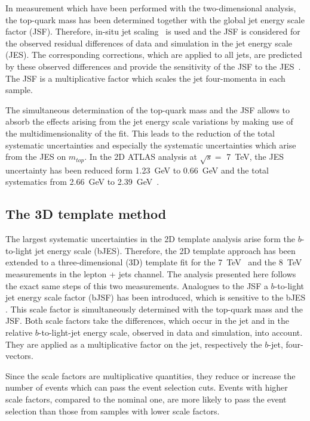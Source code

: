 In measurement which have been performed with the two-dimensional analysis, the top-quark mass has been determined together with the global jet energy scale factor (JSF). Therefore, in-situ jet scaling~\cite{ATLAS:2012aj}  is used and the JSF is considered for the observed residual differences of data and simulation in the jet energy scale (JES). The corresponding corrections, which are applied to all jets, are predicted by these observed differences and provide the sensitivity of the JSF to the JES~\cite{ATLAS:2012aj}. The JSF is a multiplicative factor which scales the jet four-momenta in each sample.  

The simultaneous determination of the top-quark mass and the JSF allows to absorb the effects arising from the jet energy scale variations by making use of the multidimensionality of the fit.
This leads to the  reduction of the total systematic uncertainties and especially the systematic uncertainties which arise from the JES  on $m_{top}$. In the 2D ATLAS analysis at $\sqrt{s} =$ 7~TeV, the JES uncertainty has been reduced form 1.23~GeV to 0.66~GeV and the total systematics from 2.66~GeV to 2.39~GeV~\cite{ATLAS:2012aj}.  


\subsection{ The 3D template method}
The largest systematic uncertainties in the 2D template analysis arise form the $b$-to-light jet energy scale (bJES). Therefore, the 2D template approach has been extended to a three-dimensional (3D) template fit for the 7~TeV~\cite{Aad:2015nba} and the 8~TeV~\cite{ATLAS-CONF-2017-071} measurements in the lepton + jets channel. The analysis presented here follows the exact same steps of this two measurements.  
Analogues  to the JSF a $b$-to-light jet energy scale factor (bJSF) has been introduced, which is sensitive to the bJES . This scale factor is simultaneously determined with the top-quark mass and the JSF.  Both scale factors take the differences, which occur in the jet and in the relative
  $b$-to-light-jet energy scale, observed in data and simulation, into account. They are
   applied as a multiplicative factor on the jet, respectively the $b$-jet, four-vectors. 
  
  Since the scale factors are  multiplicative quantities, they reduce or increase the number of events which can pass the event selection cuts. Events with higher scale factors, compared to the nominal one, are more likely to pass the event selection than those from samples with lower scale factors. 
 
